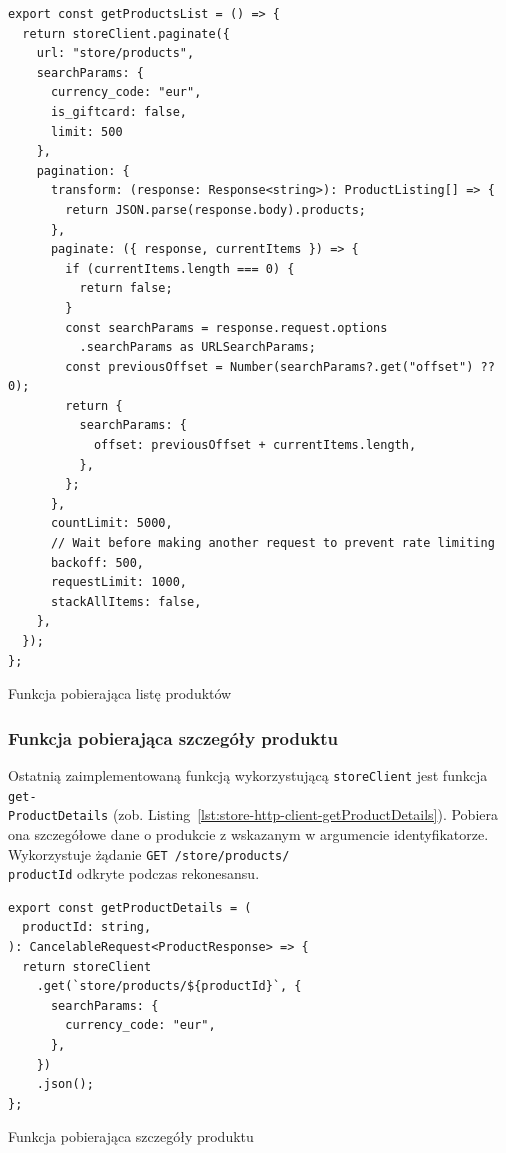 \begin{listing}[H]
    \begin{verbatim}
export const getProductsList = () => {
  return storeClient.paginate({
    url: "store/products",
    searchParams: {
      currency_code: "eur",
      is_giftcard: false,
      limit: 500
    },
    pagination: {
      transform: (response: Response<string>): ProductListing[] => {
        return JSON.parse(response.body).products;
      },
      paginate: ({ response, currentItems }) => {
        if (currentItems.length === 0) {
          return false;
        }
        const searchParams = response.request.options
          .searchParams as URLSearchParams;
        const previousOffset = Number(searchParams?.get("offset") ?? 0);
        return {
          searchParams: {
            offset: previousOffset + currentItems.length,
          },
        };
      },
      countLimit: 5000,
      // Wait before making another request to prevent rate limiting
      backoff: 500,
      requestLimit: 1000,
      stackAllItems: false,
    },
  });
};
    \end{verbatim}
    \caption{Funkcja pobierająca listę produktów}
    \label{lst:store-http-client-getProductsList}
\end{listing}

\subsubsection{Funkcja pobierająca szczegóły produktu}

Ostatnią zaimplementowaną funkcją wykorzystującą \texttt{storeClient} jest funkcja \texttt{get-\\ProductDetails} (zob. Listing~\ref{lst:store-http-client-getProductDetails}).
Pobiera ona szczegółowe dane o produkcie z wskazanym w argumencie identyfikatorze.
Wykorzystuje żądanie \texttt{GET /store/products/\\{{productId}}} odkryte podczas rekonesansu.

\begin{listing}[H]
    \begin{verbatim}
export const getProductDetails = (
  productId: string,
): CancelableRequest<ProductResponse> => {
  return storeClient
    .get(`store/products/${productId}`, {
      searchParams: {
        currency_code: "eur",
      },
    })
    .json();
};
    \end{verbatim}
    \caption{Funkcja pobierająca szczegóły produktu}
    \label{lst:store-http-client-getProductDetails}
\end{listing}

